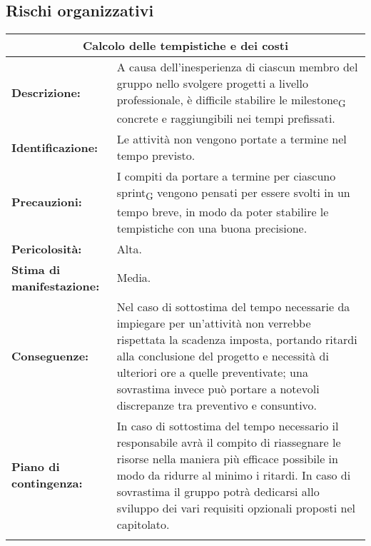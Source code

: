 \subsection{Rischi organizzativi}

\renewcommand\tabularxcolumn[1]{>{\Centering}m{#1}}
\begin{tabularx}{\textwidth}{|X|X|}
\hline
\multicolumn{2}{|c|}{\textbf{Calcolo delle tempistiche e dei costi}} \\
\hline
\textbf{Descrizione:}& A causa dell'inesperienza di ciascun membro del gruppo nello svolgere progetti a livello professionale, è difficile stabilire le milestone\textsubscript{G} concrete e raggiungibili nei tempi prefissati. \\
\hline
\textbf{Identificazione:}& Le attività non vengono portate a termine nel tempo previsto. \\
\hline
\textbf{Precauzioni:}& I compiti da portare a termine per ciascuno sprint\textsubscript{G} vengono pensati per essere svolti in un tempo breve, in modo da poter stabilire le tempistiche con una buona precisione. \\
\hline
\textbf{Pericolosità:}& Alta.\\
\hline
\textbf{Stima di manifestazione:}& Media.\\
\hline
\textbf{Conseguenze:}& Nel caso di sottostima del tempo necessarie da impiegare per un'attività non verrebbe rispettata la scadenza imposta, portando ritardi alla conclusione del progetto e necessità di ulteriori ore a quelle preventivate; una sovrastima invece può portare a notevoli discrepanze tra preventivo e consuntivo. \\
\hline
\textbf{Piano di contingenza:}& In caso di sottostima del tempo necessario il responsabile avrà il compito di riassegnare le risorse nella maniera più efficace possibile in modo da ridurre al minimo i ritardi. In caso di sovrastima il gruppo potrà dedicarsi allo sviluppo dei vari requisiti opzionali proposti nel capitolato.\\
\hline
\caption{Calcolo delle tempistiche e dei costi}
\end{tabularx}

\vspace{20pt}

